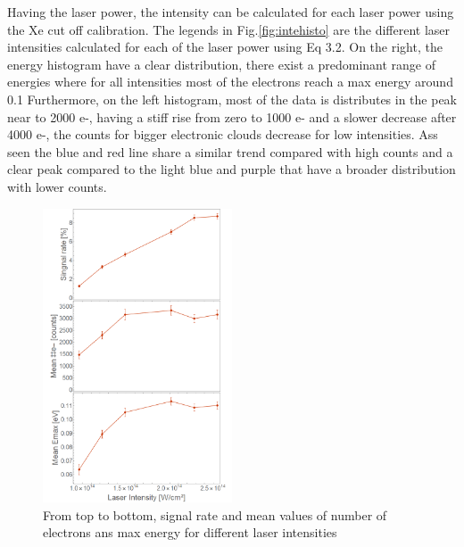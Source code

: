 Having the laser power, the intensity can be calculated for each laser power using the Xe cut off calibration. The legends in Fig.\ref{fig:intehisto} are the different laser intensities calculated for each of the laser power using Eq 3.2. On the right, the energy histogram have a clear distribution, there exist a predominant range of energies where for all intensities most of the electrons reach a max energy around 0.1  Furthermore, on the left histogram, most of the data is distributes in the peak near to 2000 e-, having a stiff rise from zero to 1000 e- and a slower decrease after 4000 e-, the counts for bigger electronic clouds  decrease for low intensities. Ass seen the blue and red line share a similar trend compared with high counts and a clear peak compared to the light blue and purple that have a broader distribution with lower counts.

\begin{figure}[h!]
\centering
\includegraphics[width=0.5\textwidth]{../Images/results/MIR_He_waterIntensityscan/alltogether.png}
\caption[MIR He intensity dependence]{From top to bottom, signal rate and mean values of number of electrons ans max energy for different laser intensities}
\label{fig:Heintensimean}
\end{figure}

